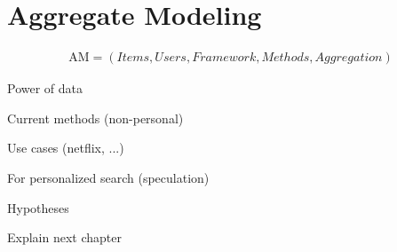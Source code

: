 
\section{Aggregate Modeling}

\begin{eqnarray}
  \mathrm{AM} = (Items, Users, Framework, Methods, Aggregation)
\end{eqnarray}

Power of data

Current methods (non-personal)

Use cases (netflix, ...)

For personalized search (speculation)

Hypotheses

Explain next chapter


